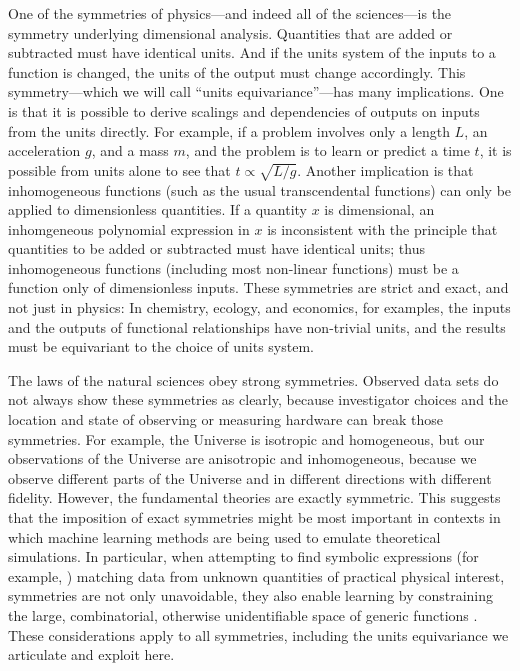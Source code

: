 \documentclass[twoside,11pt]{article}
\begin{document}
One of the symmetries of physics---and indeed all of the sciences---is the symmetry underlying dimensional analysis.
Quantities that are added or subtracted must have identical units.
And if the units system of the inputs to a function is changed, the units of the output must change accordingly.
This symmetry---which we will call ``units equivariance''---has many implications.
One is that it is possible to derive scalings and dependencies of outputs on inputs from the units directly.
For example, if a problem involves only a length $L$, an acceleration $g$, and a mass $m$, and the problem is to learn or predict a time $t$, it is possible from units alone to see that $t\propto\sqrt{L/g}$.
Another implication is that inhomogeneous functions (such as the usual transcendental functions) can only be applied to dimensionless quantities.
If a quantity $x$ is dimensional, an inhomgeneous polynomial expression in $x$ is inconsistent with the principle that quantities to be added or subtracted must have identical units; thus inhomogeneous functions (including most non-linear functions) must be a function only of dimensionless inputs.
These symmetries are strict and exact, and not just in physics:
In chemistry, ecology, and economics, for examples, the inputs and the outputs of functional relationships have non-trivial units, and the results must be equivariant to the choice of units system.

The laws of the natural sciences obey strong symmetries.
Observed data sets do not always show these symmetries as clearly, because investigator choices and the location and state of observing or measuring hardware can break those symmetries.
For example, the Universe is isotropic and homogeneous, but our observations of the Universe are anisotropic and
inhomogeneous, because we observe different parts of the Universe and in different directions with different fidelity.
However, the fundamental theories are exactly symmetric.
This suggests that the imposition of exact symmetries might be most important in contexts in which machine learning methods are being used to emulate theoretical simulations.
In particular, when attempting to find symbolic expressions (for example, \citealt{cranmer2020discovering, udrescu2020ai}) matching data from unknown quantities of practical physical interest, symmetries are not only unavoidable, they also enable learning by constraining the large, combinatorial, otherwise unidentifiable space of generic functions \citep{udrescu2020ai}. These considerations apply to all symmetries, including the units equivariance we articulate and exploit here.  
\end{document}
